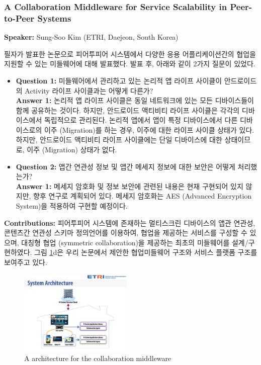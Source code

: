 \documentclass[twocolumn]{article}
\newcommand{\bi}{\begin{itemize}}
\newcommand{\ei}{\end{itemize}}
\newcommand{\ii}{\item}
\begin{document}
\subsubsection{A Collaboration Middleware for Service Scalability in Peer-to-Peer Systems}
\textbf{Speaker:} Sung-Soo Kim (ETRI, Daejeon, South Korea)

필자가 발표한 논문으로 피어투피어 시스템에서 다양한 응용 어플리케이션간의 협업을 지원할 수 있는 미들웨어에 대해 발표했다.
발표 후, 아래와 같이 2가지 질문이 있었다.

\bi
\ii \textbf{Question 1:} 미들웨어에서 관리하고 있는 논리적 앱 라이프 사이클이 안드로이드의 Activity 라이프 사이클과는 어떻게 다른가?\\
\textbf{Answer 1:} 논리적 앱 라이프 사이클은 동일 네트워크에 있는 모든 디바이스들이 함께 공유하는 것이다. 하지만, 안드로이드 액티비티 라이프 사이클은 각각의 디바이스에서 독립적으로 관리된다. 논리적 앱에서 앱이 특정 디바이스에서 다른 디바이스로의 이주 (Migration)를 하는 경우, 이주에 대한 라이프 사이클 상태가 있다. 하지만, 안드로이드 액티비티 라이프 사이클에는 단일 디바이스에 대한 상태이므로, 이주 (Migration) 상태가 없다.
\ii \textbf{Question 2:} 앱간 연관성 정보 및 앱간 메세지 정보에 대한 보안은 어떻게 처리했는가?\\
\textbf{Answer 1:} 메세지 암호화 및 정보 보안에 관련된 내용은 현재 구현되어 있지 않지만, 향후 연구로 계획되어 있다. 메세지 암호화는 AES (Advanced Encryption System)을 적용하여 구현할 예정이다.
\ei

\noindent
\textbf{Contributions:} 피어투피어 시스템에 존재하는 멀티스크린 디바이스의 앱관 연관성, 콘텐츠간 연관성 스키마 정의언어를 이용하여, 협업을 제공하는 서비스를 구성할 수 있으며, 대칭형 협업 (symmetric collaboration)을 제공하는 최초의 미들웨어를 설계/구현하였다. 그림 \ref{fig:middleware-architecture}d은 우리 논문에서 제안한 협업미들웨어 구조와 서비스 플랫폼 구조를 보여주고 있다.

\begin{figure}[htb]
        \centering
        \includegraphics[width=0.48\textwidth]{middleware.pdf}
        \caption{A architecture for the collaboration middleware}
        \label{fig:middleware-architecture}
\end{figure}
\end{document}

